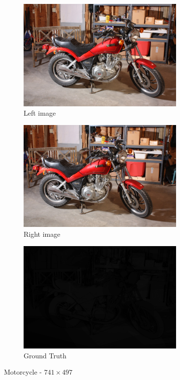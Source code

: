\begin{figure}[ht]
  \centering
  \begin{subfigure}[t]{0.3\textwidth}
    \centering\includegraphics[width=0.9\textwidth]{figures/motl.jpg}
    \caption{Left image \label{fig:apmot_l}}
  \end{subfigure}\hspace{0.5cm}
  \begin{subfigure}[t]{0.3\textwidth}
    \centering\includegraphics[width=0.9\textwidth]{figures/motr}
    \caption{Right image\label{fig:apmot_r}}
  \end{subfigure}\hspace{0.5cm}
  \begin{subfigure}[t]{0.3\textwidth}
    \centering\includegraphics[width=0.9\textwidth]{figures/mot_GT}
    \caption{Ground Truth\label{fig:apmot_gt}}
  \end{subfigure}
  \caption{Motorcycle - $741\times497$ \cite{Scharstein2014}\label{fig:apmot}}
\end{figure}